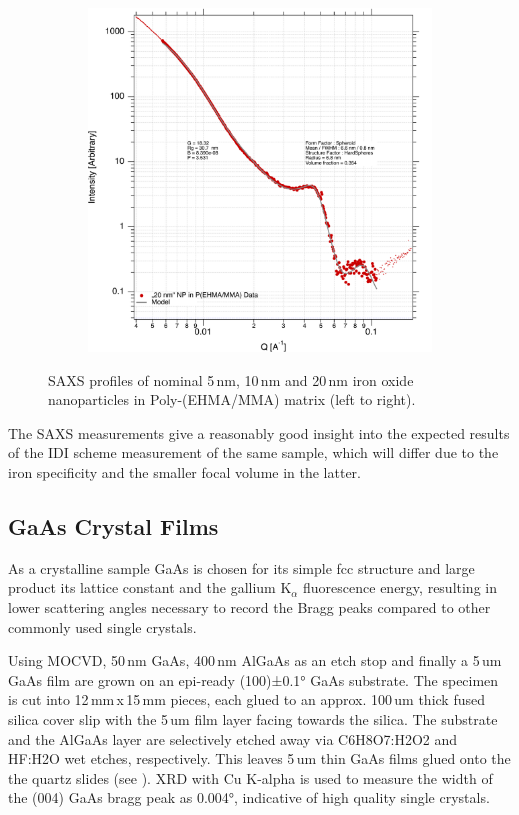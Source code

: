 \begin{figure}[tp]
\begin{subfigure}[b]{0.3\textwidth}
	\end{subfigure}
	\begin{subfigure}[b]{0.3\textwidth}
		\includegraphics[width=\linewidth]{images/pmma20.pdf}
	\end{subfigure}
	
	\caption[SAXS profile of iron oxide nanoparticles in  Poly-(EHMA/MMA) matrix]{SAXS profiles of nominal 5\,nm, 10\,nm and 20\,nm iron oxide nanoparticles in Poly-(EHMA/MMA) matrix (left to right).}
	\label{fig:saxspmma}
\end{figure}

The SAXS measurements give a reasonably good insight into the expected results of the IDI scheme measurement of the same sample, which will differ due to the iron specificity and the smaller focal volume in the latter.  

\subsection{GaAs Crystal Films}
As a crystalline sample GaAs is chosen for its simple fcc structure and large product its lattice constant and the gallium K${_\alpha}$ fluorescence energy, resulting in lower scattering angles necessary to record the Bragg peaks compared to other commonly used single crystals. 

Using MOCVD, 50\,nm GaAs, 400\,nm AlGaAs as an etch stop and finally a 5\,um GaAs film are grown on an epi-ready (100)±0.1° GaAs substrate. The specimen is cut into 12\,mm\,x\,15\,mm pieces, each glued to an approx. 100\,um thick fused silica cover slip with the 5\,um film layer facing towards the silica. The substrate and the AlGaAs layer are selectively etched away via C6H8O7:H2O2 and HF:H2O wet etches, respectively. This leaves 5\,um thin GaAs films glued onto the the quartz slides (see ).  XRD with Cu K-alpha is used to measure the width of the (004) GaAs bragg peak as 0.004°, indicative of high quality single crystals. 

